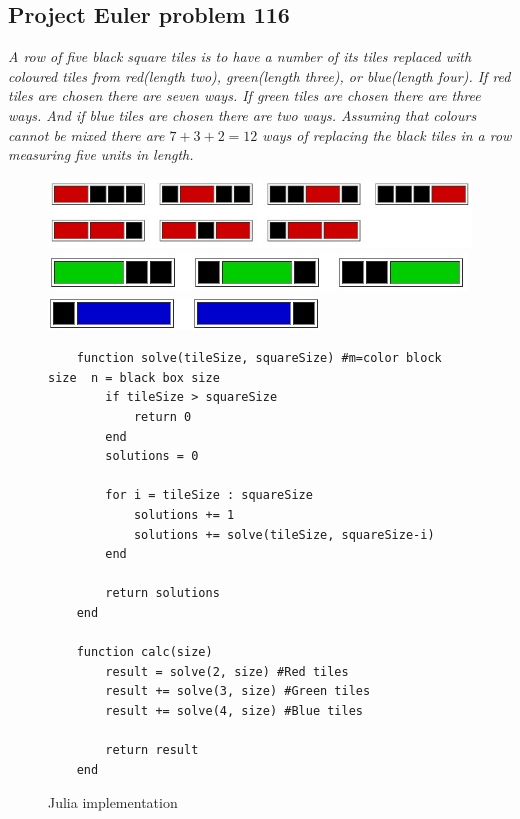 \documentclass[landscape, a0]{sciposter}
\begin{document}
\begin{multicols}{3}
\section{Project Euler problem 116}
\textit{A row of five black square tiles is to have a number of its tiles replaced with coloured tiles from red(length two), green(length three), or blue(length four). If red tiles are chosen there are seven ways. If green tiles are chosen there are three ways. And if blue tiles are chosen there are two ways. Assuming that colours cannot be mixed there are $7+3+2=12$ ways of replacing the black tiles in a row measuring five units in length.}
\begin{figure}[H]
	\centering
	\includegraphics[scale=1.60]{fig/1161.jpg}
	\includegraphics[scale=2.2]{fig/1162.jpg} 
	\includegraphics[scale=2.2]{fig/1163.jpg} 
\end{figure}
\begin{figure}[H]
	\centering
	\begin{lstlisting}
	function solve(tileSize, squareSize) #m=color block size  n = black box size
		if tileSize > squareSize
			return 0
		end
		solutions = 0
	
		for i = tileSize : squareSize
			solutions += 1
			solutions += solve(tileSize, squareSize-i)
		end
	
		return solutions
	end
	
	function calc(size)
		result = solve(2, size) #Red tiles
		result += solve(3, size) #Green tiles
		result += solve(4, size) #Blue tiles
	
		return result
	end
	\end{lstlisting}
	\caption{Julia implementation}
\end{figure}


\end{multicols}
\end{document}
